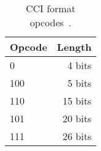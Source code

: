 \begin{table}
	\centering
	\begin{tabular}{lr}
		Opcode & Length \\
		\hline
		0 & 4 bits \\
		100 & 5 bits \\
		110 & 15 bits \\
		101 & 20 bits \\
		111 & 26 bits
	\end{tabular}

	\caption{CCI format opcodes~\cite{Lawlor:2013:compression}.}
	\label{tab:bg-comp-opcode-CCIdecodeTable}
\end{table}